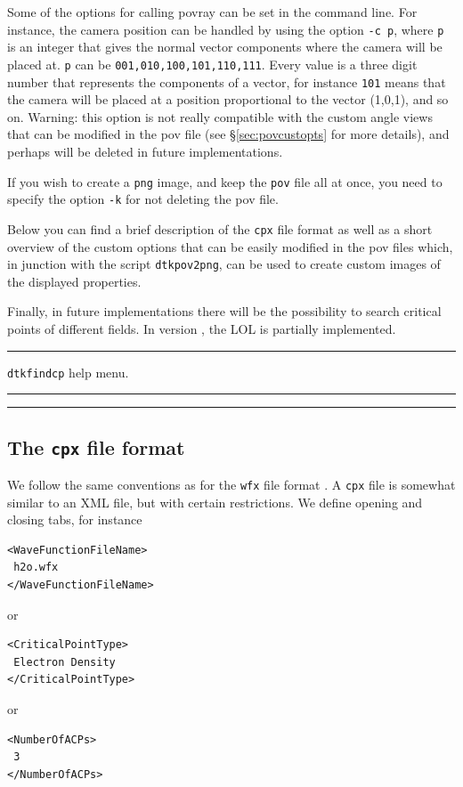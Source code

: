 Some of the options for calling povray can be set in the command line. For instance, the camera position can be handled by using the option \texttt{-c p}, where \texttt{p} is an integer that gives the normal vector components where the camera will be placed at. \texttt{p} can be \texttt{001,010,100,101,110,111}. Every value is a three digit number that represents the components of a vector, for instance \texttt{101} means that the camera will be placed at a position proportional to the vector (1,0,1), and so on. Warning: this option is not really compatible with the custom angle views that can be modified in the pov file (see \S\ref{sec:povcustopts} for more details), and perhaps will be deleted in future implementations.

If you wish to create a \texttt{png} image, and keep the \texttt{pov} file all at once, you need to specify the option \texttt{-k} for not deleting the pov file.

Below you can find a brief description of the \texttt{cpx} file format as well as a short overview of the custom options that can be easily modified in the pov files which, in junction with the script \texttt{dtkpov2png}, can  be used to create custom images of the displayed properties.

Finally, in future implementations there will be the possibility to search critical points of different fields. In version \dtkversion, the LOL is partially implemented. 


\rule{\textwidth}{1pt}
{\center\texttt{dtkfindcp} help menu.\\}
\rule{\textwidth}{1pt}
\begin{footnotesize}
\end{footnotesize}
\rule{\textwidth}{1pt}


\subsection{\label{sec:cpxfilefmt}The \texttt{cpx} file format}

We follow the same conventions as for the \texttt{wfx} file format \cite{bib:webwfxformat}. A \texttt{cpx} file is somewhat similar to an XML file, but with certain restrictions. We define opening and closing tabs, for instance
%
\begin{verbatim}
<WaveFunctionFileName>
 h2o.wfx
</WaveFunctionFileName>
\end{verbatim}
or
\begin{verbatim}
<CriticalPointType>
 Electron Density
</CriticalPointType>
\end{verbatim}
or
\begin{verbatim}
<NumberOfACPs>
 3
</NumberOfACPs>
\end{verbatim}

